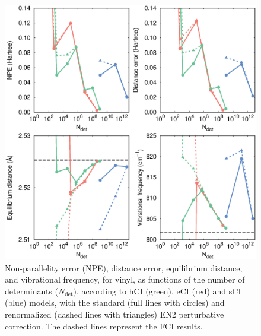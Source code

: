 \documentclass[aip,jcp,preprint,noshowkeys,superscriptaddress]{revtex4-1}
\newcommand{\Ndet}{N_\text{det}}
\begin{document}
\begin{figure}%
\includegraphics[width=1.0\linewidth]{plot_pt2_rpt2_vinyl}
\caption{
Non-parallelity error (NPE), distance error, equilibrium distance, and vibrational frequency, for vinyl,
as functions of the number of determinants ($\Ndet$), according to hCI (green), eCI (red) and sCI (blue) models,
with the standard (full lines with circles) and renormalized (dashed lines with triangles) EN2 perturbative correction.
The dashed lines represent the FCI results.}
\label{fig:plot_pt2_rpt2_vinyl}
\end{figure}
\end{document}
